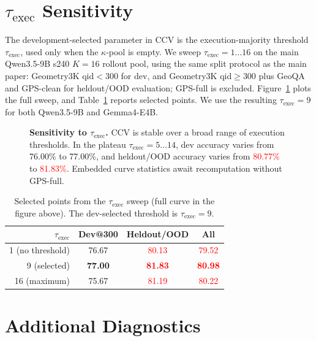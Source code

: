 \documentclass{article}
\newcommand{\ccv}{\textsc{CCV}}
\newcommand{\recheck}[1]{\textcolor{red}{#1}}
\begin{document}
\section{$\tau_{\text{exec}}$ Sensitivity}
\label{app:tau-sensitivity}

The development-selected parameter in \ccv{} is the execution-majority threshold $\tau_{\text{exec}}$, used only when the $\kappa$-pool is empty. We sweep $\tau_{\text{exec}}=1\ldots16$ on the main Qwen3.5-9B s240 $K{=}16$ rollout pool, using the same split protocol as the main paper: Geometry3K qid$<300$ for dev, and Geometry3K qid$\geq300$ plus GeoQA and GPS-clean for heldout/OOD evaluation; GPS-full is excluded. Figure~\ref{fig:tau-sensitivity} plots the full sweep, and Table~\ref{tab:tau-sensitivity} reports selected points. We use the resulting $\tau_{\text{exec}}{=}9$ for both Qwen3.5-9B and Gemma4-E4B.

\begin{figure}[h]
    \centering
    
    \caption{\textbf{Sensitivity to $\tau_{\text{exec}}$.} \ccv{} is stable over a broad range of execution thresholds. In the plateau $\tau_{\text{exec}}=5\ldots14$, dev accuracy varies from 76.00\% to 77.00\%, and heldout/OOD accuracy varies from \recheck{80.77\%} to \recheck{81.83\%}. Embedded curve statistics await recomputation without GPS-full.}
    \label{fig:tau-sensitivity}
\end{figure}

\begin{table}[h]
\centering
\caption{Selected points from the $\tau_{\text{exec}}$ sweep (full curve in the figure above). The dev-selected threshold is $\tau_{\text{exec}}=9$.}
\label{tab:tau-sensitivity}
\small
\begin{tabular}{rccc}
\toprule
$\tau_{\text{exec}}$ & Dev@300 & Heldout/OOD & All \\
\midrule
1 (no threshold) & 76.67 & \recheck{80.13} & \recheck{79.52} \\
9 (selected) & \textbf{77.00} & \recheck{\textbf{81.83}} & \recheck{\textbf{80.98}} \\
16 (maximum) & 75.67 & \recheck{81.19} & \recheck{80.22} \\
\bottomrule
\end{tabular}
\end{table}

\section{Additional Diagnostics}
\label{app:diagnostics}
\end{document}
